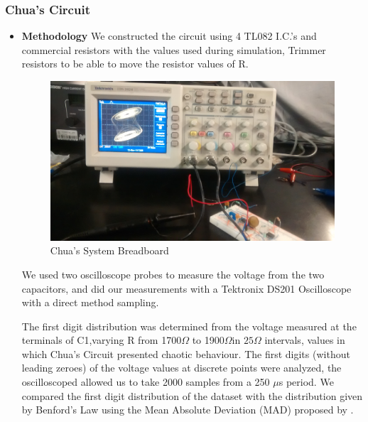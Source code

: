 \subsubsection{Chua's Circuit}
 \begin{itemize}
  \item \textbf{Methodology}
We constructed the circuit using 4 TL082 I.C.'s and commercial resistors with the values used during simulation, Trimmer resistors to be able to move the resistor values of R.

            \begin{figure}[h]
            \centering
            \includegraphics[scale=0.1]{imagenes/2-benford/chua_breadboard.jpg}
            \caption{Chua's System Breadboard}
            \end{figure}
We used two oscilloscope probes to measure the voltage from the two capacitors, and did our measurements with  a Tektronix DS201 Oscilloscope with a direct method sampling.

 The first digit distribution was determined from the voltage measured at the terminals of C1,varying R from 1700$\Omega$ to 1900$\Omega$in $25\Omega$ intervals, values in which Chua's Circuit presented chaotic behaviour. The first digits (without leading zeroes) of the voltage values at discrete points were analyzed, the oscilloscoped allowed us to take 2000 samples from a 250 $\mu$s period. We compared the first digit distribution of the dataset with the distribution given by Benford's Law using the Mean Absolute Deviation (MAD) proposed by \cite{Nigrini97}.




\end{itemize}
